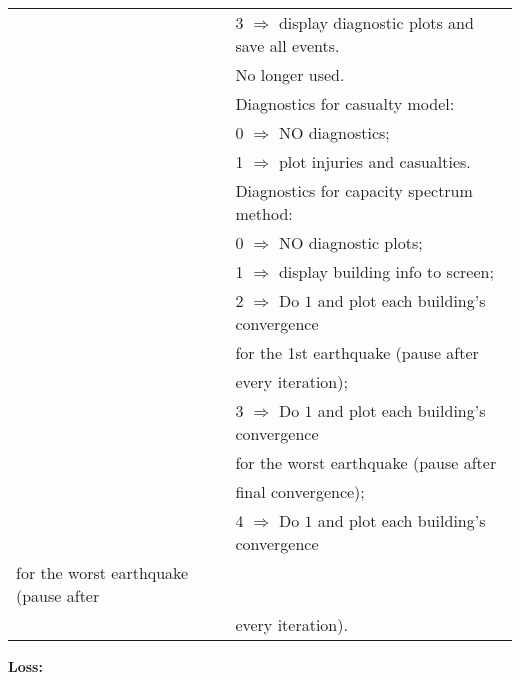 \begin{supertabular}{lp{0.6\textwidth}}
& \hspace{0.5em} 3 $\Rightarrow$ display diagnostic plots and save all events.  \\
    & No longer used.      \\
   &  Diagnostics for casualty model: \\
& \hspace{0.5em} 0 $\Rightarrow$ NO diagnostics; \\
& \hspace{0.5em} 1 $\Rightarrow$ plot injuries and casualties.     \\
   &  Diagnostics for capacity spectrum method: \\
& \hspace{0.5em} 0 $\Rightarrow$ NO diagnostic plots; \\
& \hspace{0.5em} 1 $\Rightarrow$ display building info to screen; \\
& \hspace{0.5em} 2 $\Rightarrow$ Do $1$ and plot each building's convergence \\
& \hspace{2.8em} for the 1st earthquake (pause after \\
& \hspace{2.8em} every iteration); \\
& \hspace{0.5em} 3 $\Rightarrow$ Do $1$ and plot each building's convergence \\
& \hspace{2.8em} for the worst earthquake (pause after \\
& \hspace{2.8em} final convergence); \\
& \hspace{0.5em} 4 $\Rightarrow$ Do $1$ and plot each building's convergence \\
for the worst earthquake (pause after \\
& \hspace{2.8em} every iteration).    \\
 \end{supertabular}

\vspace{2em} \textbf{Loss:}

